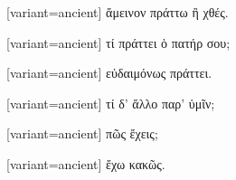 %

\switchcolumn

\begin{greek}[variant=ancient]%
ἄμεινον πράττω ἢ χθές.

\end{greek}%
\switchcolumn*

%

\switchcolumn

\begin{greek}[variant=ancient]%
τί πράττει ὁ πατήρ σου;

\end{greek}%
\switchcolumn*

%

\switchcolumn

\begin{greek}[variant=ancient]%
εὐδαιμόνως πράττει.

\end{greek}%
\switchcolumn*

%

\switchcolumn

\begin{greek}[variant=ancient]%
τί δ' ἄλλο παρ' ὑμῖν;

\end{greek}%
\switchcolumn*

%

\switchcolumn

\begin{greek}[variant=ancient]%
πῶς ἔχεις;

\end{greek}%
\switchcolumn*

%

\switchcolumn

\begin{greek}[variant=ancient]%
ἔχω κακῶς.

\end{greek}%
\switchcolumn*

%

\switchcolumn


